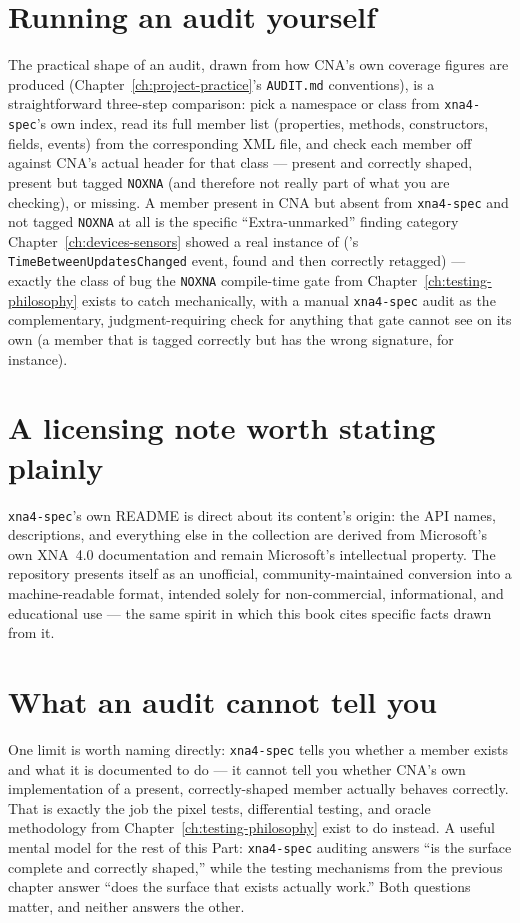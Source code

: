 \section{Running an audit yourself}

The practical shape of an audit, drawn from how CNA's own coverage figures are produced
(Chapter~\ref{ch:project-practice}'s \texttt{AUDIT.md} conventions), is a straightforward
three-step comparison: pick a namespace or class from \texttt{xna4-spec}'s own index, read
its full member list (properties, methods, constructors, fields, events) from the
corresponding XML file, and check each member off against CNA's actual header for that class
--- present and correctly shaped, present but tagged \texttt{NOXNA} (and therefore not really
part of what you are checking), or missing. A member present in CNA but absent from
\texttt{xna4-spec} and not tagged \texttt{NOXNA} at all is the specific ``Extra-unmarked''
finding category Chapter~\ref{ch:devices-sensors} showed a real instance of
('s \texttt{TimeBetweenUpdatesChanged} event, found and then correctly
retagged) --- exactly the class of bug the \texttt{NOXNA} compile-time gate from
Chapter~\ref{ch:testing-philosophy} exists to catch mechanically, with a manual
\texttt{xna4-spec} audit as the complementary, judgment-requiring check for anything that
gate cannot see on its own (a member that is tagged correctly but has the wrong signature, for
instance).

\section{A licensing note worth stating plainly}

\texttt{xna4-spec}'s own README is direct about its content's origin: the API names,
descriptions, and everything else in the collection are derived from Microsoft's own XNA~4.0
documentation and remain Microsoft's intellectual property. The repository presents itself as
an unofficial, community-maintained conversion into a machine-readable format, intended
solely for non-commercial, informational, and educational use --- the same spirit in which
this book cites specific facts drawn from it.

\section{What an audit cannot tell you}

One limit is worth naming directly: \texttt{xna4-spec} tells you whether a member exists and
what it is documented to do --- it cannot tell you whether CNA's own implementation of a
present, correctly-shaped member actually behaves correctly. That is exactly the job the
pixel tests, differential testing, and oracle methodology from
Chapter~\ref{ch:testing-philosophy} exist to do instead. A useful mental model for the rest of
this Part: \texttt{xna4-spec} auditing answers ``is the surface complete and correctly
shaped,'' while the testing mechanisms from the previous chapter answer ``does the surface
that exists actually work.'' Both questions matter, and neither answers the other.
